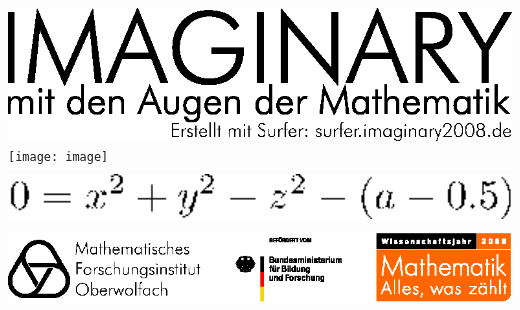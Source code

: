 \documentclass[a5paper]{article}
\begin{document}
%
\begin{center}%
\includegraphics[width=\linewidth]{surfer_print_header}\\[7mm]%
\texttt{[image: image]}\\[2mm]%
\includegraphics[keepaspectratio,width=0.9\linewidth,height=1.625cm]{eps_formula}\\%
\vfill%
\includegraphics[width=\linewidth]{surfer_print_footer}%
\end{center}%
\end{document}

